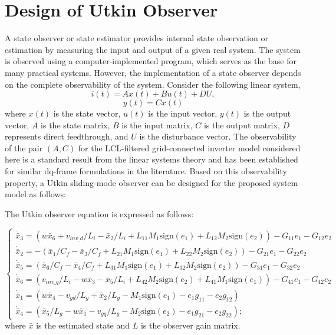 \documentclass[preprint,12pt]{elsarticle}
\begin{document}
\section{Design of Utkin Observer}
\label{sec5}
A state observer or state estimator provides internal state observation or estimation by measuring the input and output of a given real system. The system is observed using a computer-implemented program, which serves as the base for many practical systems. However, the implementation of a state observer depends on the complete observability of the system.
Consider the following linear system,
\begin{equation}
    i(t) = Ax(t) + Bu(t) + DU,
\end{equation}
\begin{equation}
    y(t) = Cx(t)
\end{equation}
where \( x(t) \) is the state vector, \( u(t) \) is the input vector, \( y(t) \) is the output vector, \( A \) is the state matrix, \( B \) is the input matrix, \( C \) is the output matrix, \( D \) represents direct feedthrough, and \( U \) is the disturbance vector. The observability of the pair \((A, C)\) for the LCL-filtered grid-connected inverter model considered here is a standard result from the linear systems theory and has been established for similar dq-frame formulations in the literature. Based on this observability property, a Utkin sliding-mode observer can be designed for the proposed system model as follows:

The Utkin observer equation is expressed as follows:

{\scriptsize
\setlength{\arraycolsep}{3pt}
\begin{equation}
\begin{cases}
\dot{\bar{x}}_3 = \left( w\bar{x}_6 + v_{inv\_d} / L_i - \bar{x}_2 / L_i + L_{11}M_1\text{sign}(e_1) + L_{12}M_2\text{sign}(e_2) \right) - G_{11}e_1 - G_{12}e_2 \\

\dot{\bar{x}}_2 = -\left( \bar{x}_1 / C_f - \bar{x}_3 / C_f + L_{21}M_1\text{sign}(e_1) + L_{22}M_2\text{sign}(e_2) \right) - G_{21}e_1 - G_{22}e_2 \\

\dot{\bar{x}}_5 = \left( \bar{x}_6 / C_f - \bar{x}_4 / C_f + L_{31}M_1\text{sign}(e_1) + L_{32}M_2\text{sign}(e_2) \right) - G_{31}e_1 - G_{32}e_2 \\

\dot{\bar{x}}_6 = \left( v_{inv\_q} / L_i - w\bar{x}_3 - \bar{x}_5 / L_i + L_{42}M_2\text{sign}(e_2) + L_{41}M_1\text{sign}(e_1) \right) - G_{41}e_1 - G_{42}e_2 \\

\dot{\bar{x}}_1 = \left( w\bar{x}_4 - v_{gd} / L_g + \bar{x}_2 / L_g - M_1\text{sign}(e_1) - e_1g_{11} - e_2g_{12} \right) \\

\dot{\bar{x}}_4 = \left( \bar{x}_5 / L_g - w\bar{x}_1 - v_{gq} / L_g - M_2\text{sign}(e_2) - e_1g_{21} - e_2g_{22} \right);
\end{cases}
\end{equation}
}
where $\bar{x}$ is the estimated state and $L$ is the observer gain matrix.
\end{document}
